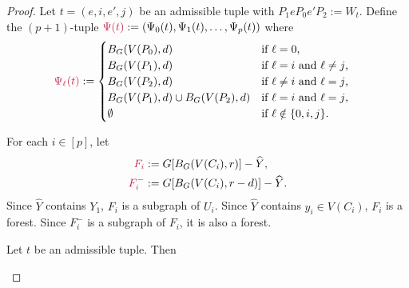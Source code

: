 \documentclass{patmorin}
\DeclareMathOperator{\dist}{dist}
\DeclarePairedDelimiter\set{\{}{\}}
\begin{document}
\begin{proof}

Let $t=(e,i,e',j)$ be an admissible tuple with $P_1eP_0e'P_2:=W_t$. Define the $(p+1)$-tuple $\mathdefin{\Psi(t)}:=(\Psi_0(t),\Psi_1(t),\ldots,\Psi_p(t))$ where
\begin{align*}
    \mathdefin{\Psi_\ell(t)} &:=
    \begin{cases}
        B_{G}(V(P_0),d)&\textrm{if $\ell=0$,}\\
        B_{G}(V(P_1),d)&\textrm{if $\ell=i$ and $\ell\neq j$,}\\
        B_{G}(V(P_2),d)&\textrm{if $\ell\neq i$ and $\ell= j$,}\\
        B_{G}(V(P_1),d)\cup B_{G}(V(P_2),d)&\textrm{if $\ell= i$ and $\ell= j$,}\\
        \emptyset&\textrm{if $\ell\notin\{0,i,j\}$.}
    \end{cases}
\end{align*}

For each $i\in[p]$, let 
\begin{align*}
\mathdefin{F_i}&:=G[B_G(V(C_i),r)]-\widehat{Y},\\
\mathdefin{F_i^-}&:=G[B_G(V(C_i),r-d)]-\widehat{Y}. 
\end{align*}
Since $\widehat{Y}$ contains $Y_1$, 
$F_i$ is a subgraph of $U_i$.  Since $\widehat{Y}$ contains $y_i\in V(C_i)$, $F_i$ is a forest.  Since $F^-_i$ is a subgraph of $F_i$, it is also a forest.

\begin{clm}\label{clm:three-components}
Let $t$ be an admissible tuple. Then
\end{clm}


\end{proof}
\end{document}
